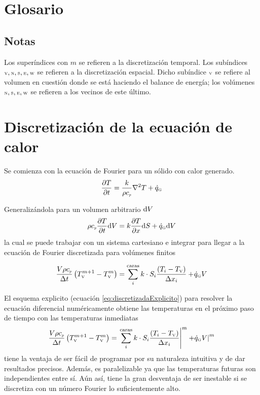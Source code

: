 \documentclass[11pt, titlepage]{article}
\begin{document}

%

\section*{Glosario}


\subsection*{Notas}
Los superíndices con $m$ se refieren a la discretización temporal. Los subíndices ${\text{\tiny V}},{\text{\tiny N}},{\text{\tiny S}},{\text{\tiny E}},{\text{\tiny W}}$ se refieren a la discretización espacial. Dicho subíndice ${\text{\tiny V}}$ se refiere al volumen en cuestión donde se está haciendo el balance de energía; los volúmenes ${\text{\tiny N}},{\text{\tiny S}},{\text{\tiny E}},{\text{\tiny W}}$ se refieren a los vecinos de este último. 

\section{Discretización de la ecuación de calor}
Se comienza con la ecuación de Fourier para un sólido con calor generado.
\begin{equation}\label{eq:fourier}
    \frac{\partial T}{\partial t} = \frac{ k }{\rho {c_{\textit{\tiny p}}}} \nabla^2 T + {\dot{q}_{\text{\tiny G}}}
\end{equation}

Generalizándola para un volumen arbitrario $\mathrm{d} V$ 
\begin{equation} \label{eq:fourierVolumenes}
     \rho {c_{\textit{\tiny p}}} \frac{\partial T}{\partial t} \mathrm{d} V = k \frac{\partial T}{\partial x} \mathrm{d} S + {\dot{q}_{\text{\tiny G}}} \mathrm{d} V
\end{equation}
la cual se puede trabajar con un sistema cartesiano e integrar para llegar a la ecuación de Fourier discretizada para volúmenes finitos

\begin{equation}
        \frac{V\rho {c_{\textit{\tiny p}}}}{\Delta t}\left(T_{\text{\tiny V}}^{m+1}-T_{\text{\tiny V}}^{m} \right) = \sum_i^{\text{caras}} k\cdot S_i\frac{(T_i-T_{\text{\tiny V}})}{\Delta x_i}+\!  {\dot{q}_{\text{\tiny G}}} V 
\end{equation}

El esquema explicito (ecuación \ref{eq:discretizadaExplicito}) para resolver la ecuación diferencial numéricamente obtiene las temperaturas en el próximo paso de tiempo con las temperaturas inmediatas
\begin{equation} \label{eq:discretizadaExplicito}
    \frac{V\rho {c_{\textit{\tiny p}}}}{\Delta t}\left(T_{\text{\tiny V}}^{m+1}-T_{\text{\tiny V}}^{m} \right) = \left.\sum_i^{\text{caras}} k\cdot S_i\frac{(T_i-T_{\text{\tiny V}})}{\Delta x_i}\right|^{m} +\!\! \left. {\dot{q}_{\text{\tiny G}}} V \right|^{m}
\end{equation}
tiene la ventaja de ser fácil de programar por su naturaleza intuitiva y de dar resultados precisos. Además, es paralelizable ya que las temperaturas futuras son independientes entre sí. Aún así, tiene la gran desventaja de ser inestable si se discretiza con un número Fourier lo suficientemente alto.
\end{document}
